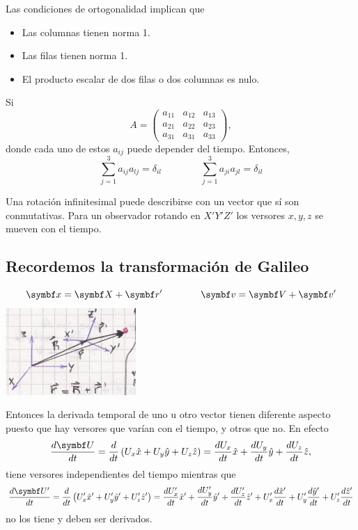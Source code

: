 \documentclass[10pt,oneside]{CBFT_book}
\begin{document}
Las condiciones de ortogonalidad implican que 
\begin{itemize}
 \item Las columnas tienen norma 1.
 \item Las filas tienen norma 1.
 \item El producto escalar de dos filas o dos columnas es nulo.
\end{itemize}

Si 
\[
	A = \begin{pmatrix}
		a_{11} & a_{12} & a_{13} \\
		a_{21} & a_{22} & a_{23} \\
		a_{31} & a_{31} & a_{33} 
	    \end{pmatrix},
\]
donde cada uno de estos $ a_{ij} $ puede depender del tiempo. Entonces,
\[
	\sum_{j=1}^3 a_{ij} a_{lj} = \delta_{il} \qquad \qquad 
	\sum_{j=1}^3 a_{ji} a_{jl} = \delta_{il} 
\]

Una rotación infinitesimal puede describirse con un vector que sí son conmutativas.
Para un observador rotando en $X'Y'Z'$ los versores $x,y,z$ se mueven con el tiempo.

\subsection{Recordemos la transformación de Galileo}
\[
	\vb{x} = \vb{X} + \vb{r}' \qquad \qquad 
	\vb{v} = \vb{V} + \vb{v}'
\]
\includegraphics[scale=0.5]{images/fig_mc_rotantes_galileo.jpg}

Entonces la derivada temporal de uno u otro vector tienen diferente aspecto puesto 
que hay versores que varían con el tiempo, y otros que no. En efecto
\[
	\dtot{\vb{U}}{t} = \dtot{}{t} \left( U_x \hat{x} + U_y \hat{y} + U_z \hat{z} \right) =
	\dtot{U_x}{t}\hat{x} + \dtot{U_y}{t} \hat{y} + \dtot{U_z}{t} \hat{z},
\]
tiene versores independientes del tiempo mientras que 
\[
	\dtot{\vb{U}'}{t} = \dtot{}{t} \left( U_x' \hat{x}' + U_y' \hat{y}' + U_z' \hat{z}' \right) =
	\dtot{U_x'}{t}\hat{x}' + \dtot{U_y'}{t} \hat{y}' + \dtot{U_z'}{t} \hat{z}' +
	U_x'\dtot{\hat{x}'}{t} + U_y'\dtot{\hat{y}'}{t} + U_z' \dtot{\hat{z}'}{t} 
\]
no los tiene y deben ser derivados.
\end{document}
